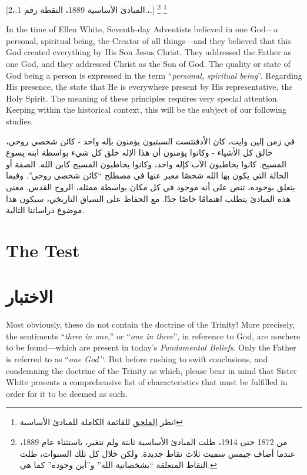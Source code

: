 [المبادئ الأساسية 1889، النقطة رقم 1.،2.،.] \footnote{انظر \hyperref[chap:appendix]{الملحق} للقائمة الكاملة للمبادئ الأساسية} \footnote{من 1872 حتى 1914، ظلت المبادئ الأساسية ثابتة ولم تتغير، باستثناء عام 1889، عندما أضاف جيمس سميث ثلاث نقاط جديدة. ولكن خلال كل تلك السنوات، ظلت النقاط المتعلقة “بشخصانية الله” و”أين وجوده” كما هي.}


In the time of Ellen White, Seventh-day Adventists believed in one God—a personal, spiritual being, the Creator of all things—and they believed that this God created everything by His Son Jesus Christ. They addressed the Father as one God, and they addressed Christ as the Son of God. The quality or state of God being a person is expressed in the term “\textit{personal, spiritual being}”. Regarding His presence, the  state that He is everywhere present by His representative, the Holy Spirit. The meaning of these principles requires very special attention. Keeping within the historical context, this will be the subject of our following studies.


في زمن إلين وايت، كان الأدفنتست السبتيون يؤمنون بإله واحد - كائن شخصي روحي، خالق كل الأشياء - وكانوا يؤمنون أن هذا الإله خلق كل شيء بواسطة ابنه يسوع المسيح. كانوا يخاطبون الآب كإله واحد، وكانوا يخاطبون المسيح كابن الله. الصفة أو الحالة التي يكون بها الله شخصًا معبر عنها في مصطلح “كائن شخصي روحي”. وفيما يتعلق بوجوده، تنص  على أنه موجود في كل مكان بواسطة ممثله، الروح القدس. معنى هذه المبادئ يتطلب اهتمامًا خاصًا جدًا. مع الحفاظ على السياق التاريخي، سيكون هذا موضوع دراساتنا التالية.


\section*{The Test}


\section*{الاختبار}


Most obviously, these  do not contain the doctrine of the Trinity! More precisely, the sentiments “\textit{three in one},” or “\textit{one in three}”, in reference to God, are nowhere to be found—which are present in today’s \textit{Fundamental Beliefs}. Only the Father is referred to as “\textit{one God’‘}. But before rushing to swift conclusions, and condemning the doctrine of the Trinity as which, please bear in mind that Sister White presents a comprehensive list of characteristics that must be fulfilled in order for it to be deemed as such.


